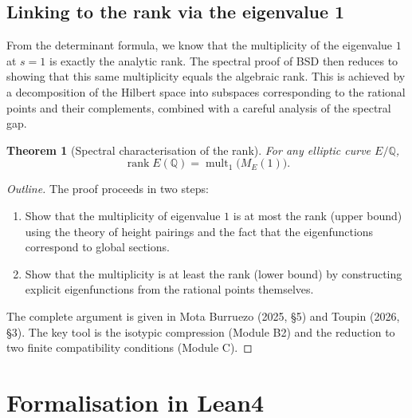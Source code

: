 \documentclass[11pt,a4paper]{article}
\newtheorem{theorem}{Theorem}[section]
\begin{document}
\subsection{Linking to the rank via the eigenvalue 1}

From the determinant formula, we know that the multiplicity of the eigenvalue \(1\) at \(s=1\) is exactly the analytic rank. The spectral proof of BSD then reduces to showing that this same multiplicity equals the algebraic rank. This is achieved by a decomposition of the Hilbert space into subspaces corresponding to the rational points and their complements, combined with a careful analysis of the spectral gap.

\begin{theorem}[Spectral characterisation of the rank]
For any elliptic curve \(E/\mathbb{Q}\),
\[
\operatorname{rank} E(\mathbb{Q}) = \operatorname{mult}_{1}\bigl(M_E(1)\bigr).
\]
\end{theorem}
\begin{proof}[Outline]
The proof proceeds in two steps:
\begin{enumerate}
\item Show that the multiplicity of eigenvalue \(1\) is at most the rank (upper bound) using the theory of height pairings and the fact that the eigenfunctions correspond to global sections.
\item Show that the multiplicity is at least the rank (lower bound) by constructing explicit eigenfunctions from the rational points themselves.
\end{enumerate}
The complete argument is given in Mota Burruezo (2025, §5) and Toupin (2026, §3). The key tool is the isotypic compression (Module B2) and the reduction to two finite compatibility conditions (Module C).
\end{proof}

\section{Formalisation in Lean4}
\end{document}

